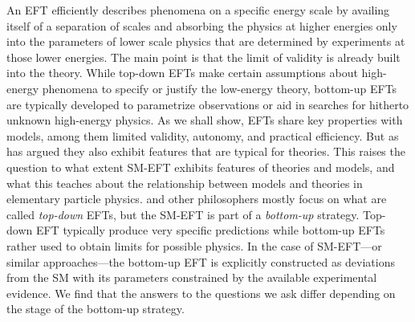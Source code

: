 
An EFT efficiently describes phenomena on a specific energy scale by availing itself of a separation of scales and absorbing the physics at higher energies only into the parameters of lower scale physics that are determined by experiments at those lower energies. 
The main point is that the limit of validity is already built into the theory. 
While top-down EFTs make certain assumptions about high-energy phenomena to specify or justify the low-energy theory, bottom-up EFTs are typically developed to parametrize observations or aid in searches for hitherto unknown high-energy physics.
As we shall show, EFTs share key properties with models, among them limited validity, autonomy, and practical efficiency. 
But as \citet{hartmann2001} has argued they also exhibit features that are typical for theories. 
This raises the question to what extent SM-EFT exhibits features of theories and models, and what this teaches about the relationship between models and theories in elementary particle physics.
\citet{hartmann2001} and other philosophers mostly focus on what are called \textit{top-down} EFTs, but the SM-EFT is part of a \textit{bottom-up} strategy.
Top-down EFT typically produce very specific predictions while bottom-up EFTs rather used to obtain limits for possible physics. 
In the case of SM-EFT---or similar approaches---the bottom-up EFT is explicitly constructed as deviations from the SM with its parameters constrained by the available experimental evidence. 
We find that the answers to the questions we ask differ depending on the stage of the bottom-up strategy.


